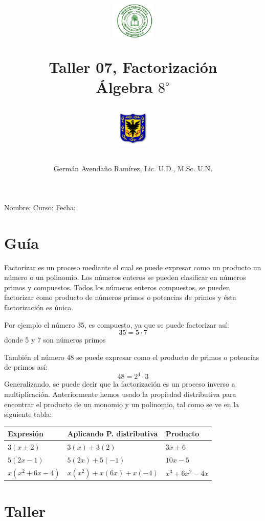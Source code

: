\documentclass[10pt,twoside]{article}
\author{Germ\'an Avenda\~no Ram\'irez, Lic. U.D., M.Sc. U.N.}
\title{\begin{minipage}{.2\textwidth}
\includegraphics[height=1.75cm]{Images/logo-colegio.png}\end{minipage}
\begin{minipage}{.55\textwidth}
\begin{center}
Taller 07, Factorización  \\
Álgebra $8^{\circ}$
\end{center}
\end{minipage}\hfill
\begin{minipage}{.2\textwidth}
\includegraphics[height=1.75cm]{Images/logo-sed.png} 
\end{minipage}}
\date{}
\begin{document}
\maketitle
Nombre: \hrulefill Curso: \underline{\hspace*{44pt}} Fecha: \underline{\hspace*{2.5cm}}
\section*{Gu\'{i}a}
Factorizar es un proceso mediante el cual se puede expresar como un producto un número o un polinomio. Los números enteros se pueden clasificar en números primos y compuestos. Todos los números enteros compuestos, se pueden factorizar como producto de números primos o potencias de primos y ésta factorización es única.

Por ejemplo el número 35, es compuesto, ya que se puede factorizar así:
\[35=5\cdot 7\]
donde 5 y 7 son números primos

También el número 48 se puede expresar como el producto de primos o potencias de primos así:
\[48=2^{4}\cdot 3\]
Generalizando, se puede decir que la factorización es un proceso inverso a multiplicación. Anteriormente hemos usado la propiedad distributiva para encontrar el producto de un monomio y un polinomio, tal como se ve en la siguiente tabla:

\begin{tabular}{l|l|l}
\hline 
Expresión & Aplicando P. distributiva & Producto \\ \hline
$3(x+2)$ & $3(x)+3(2)$ & $3x+6$ \\ 
$5(2x-1)$ & $5(2x)+5(-1)$ & $10x-5$ \\ 
$x(x^{2}+6x-4)$ & $x(x^{2})+x(6x)+x(-4)$ & $x^{3}+6x^{2}-4x$ \\ 
\hline 
\end{tabular} 
\section*{Taller}
\end{document}
